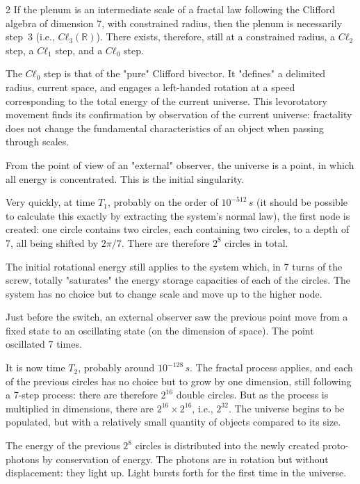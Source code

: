 \begin{multicols}{2}
	If the plenum is an intermediate scale of a fractal law following the Clifford algebra of dimension 7, with constrained radius, then the plenum is necessarily step~3 (i.e., $Cℓ_3(\mathbb{R})$). There exists, therefore, still at a constrained radius, a $Cℓ_2$ step, a $Cℓ_1$ step, and a $Cℓ_0$ step.
	
	The $Cℓ_0$ step is that of the "pure" Clifford bivector. It "defines" a delimited radius, current space, and engages a left-handed rotation at a speed corresponding to the total energy of the current universe. This levorotatory movement finds its confirmation by observation of the current universe: fractality does not change the fundamental characteristics of an object when passing through scales.
	
	From the point of view of an "external" observer, the universe is a point, in which all energy is concentrated. This is the initial singularity.
	
	Very quickly, at time $T_1$, probably on the order of $10^{-512}\,s$ (it should be possible to calculate this exactly by extracting the system's normal law), the first node is created: one circle contains two circles, each containing two circles, to a depth of 7, all being shifted by $2\pi/7$. There are therefore $2^8$ circles in total.
	
	The initial rotational energy still applies to the system which, in 7 turns of the screw, totally "saturates" the energy storage capacities of each of the circles. The system has no choice but to change scale and move up to the higher node.
	
	Just before the switch, an external observer saw the previous point move from a fixed state to an oscillating state (on the dimension of space). The point oscillated 7 times.
	
	
	
	It is now time $T_2$, probably around $10^{-128}\,s$. The fractal process applies, and each of the previous circles has no choice but to grow by one dimension, still following a 7-step process: there are therefore $2^{16}$ double circles. But as the process is multiplied in dimensions, there are $2^{16} \times 2^{16}$, i.e., $2^{32}$. The universe begins to be populated, but with a relatively small quantity of objects compared to its size.
	
	The energy of the previous $2^8$ circles is distributed into the newly created proto-photons by conservation of energy. The photons are in rotation but without displacement: they light up. Light bursts forth for the first time in the universe.
	

\end{multicols}
